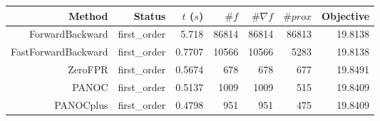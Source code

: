 \begin{tabular}{rrrrrrr}
  \toprule
  \textbf{Method} & \textbf{Status} & \textbf{$t$ ($s$)} & \textbf{$\#f$} & \textbf{$\#\nabla f$} & \textbf{$\#prox$} & \textbf{Objective} \\
  \midrule
  ForwardBackward & first\_order & 5.718 & 86814 & 86814 & 86813 & 19.8138 \\
  FastForwardBackward & first\_order & 0.7707 & 10566 & 10566 & 5283 & 19.8138 \\
  ZeroFPR & first\_order & 0.5674 & 678 & 678 & 677 & 19.8491 \\
  PANOC & first\_order & 0.5137 & 1009 & 1009 & 515 & 19.8409 \\
  PANOCplus & first\_order & 0.4798 & 951 & 951 & 475 & 19.8409 \\
  \bottomrule
\end{tabular}

